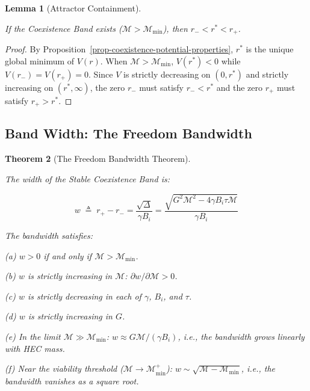 \documentclass[11pt]{article}
\theoremstyle{plain}
\newtheorem{theorem}{Theorem}
\newtheorem{lemma}[theorem]{Lemma}
\theoremstyle{definition}
\theoremstyle{remark}
\let\origsubsection\subsection
\renewcommand{\subsection}{\needspace{7\baselineskip}\origsubsection}
\begin{document}
\begin{lemma}[Attractor Containment]
\label{lem-attractor-containment}

If the Coexistence Band exists ($\mathcal{M} > \mathcal{M}_{\min}$), then $r_- < r^* < r_+$.
\end{lemma}

\begin{proof}
By Proposition~\ref{prop-coexistence-potential-properties}, $r^*$ is the unique global minimum of $V(r)$. When $\mathcal{M} > \mathcal{M}_{\min}$, $V(r^*) < 0$ while $V(r_-) = V(r_+) = 0$. Since $V$ is strictly decreasing on $(0, r^*)$ and strictly increasing on $(r^*, \infty)$, the zero $r_-$ must satisfy $r_- < r^*$ and the zero $r_+$ must satisfy $r_+ > r^*$.
\end{proof}

\subsection{Band Width: The Freedom
Bandwidth}\label{band-width-the-freedom-bandwidth}

\begin{theorem}[The Freedom Bandwidth Theorem]
\label{thm-freedom-bandwidth}

The width of the Stable Coexistence Band is:

$$w \;\triangleq\; r_+ - r_- = \frac{\sqrt{\Delta}}{\gamma B_i} = \frac{\sqrt{G^2 \mathcal{M}^2 - 4\gamma B_i \tau \mathcal{M}}}{\gamma B_i}$$

The bandwidth satisfies:

(a) $w > 0$ if and only if $\mathcal{M} > \mathcal{M}_{\min}$.

(b) $w$ is strictly increasing in $\mathcal{M}$: $\partial w / \partial \mathcal{M} > 0$.

(c) $w$ is strictly decreasing in each of $\gamma$, $B_i$, and $\tau$.

(d) $w$ is strictly increasing in $G$.

(e) In the limit $\mathcal{M} \gg \mathcal{M}_{\min}$: $w \approx G\mathcal{M}/(\gamma B_i)$, i.e., the bandwidth grows linearly with HEC mass.

(f) Near the viability threshold ($\mathcal{M} \to \mathcal{M}_{\min}^+$): $w \sim \sqrt{\mathcal{M} - \mathcal{M}_{\min}}$, i.e., the bandwidth vanishes as a square root.
\end{theorem}
\end{document}
